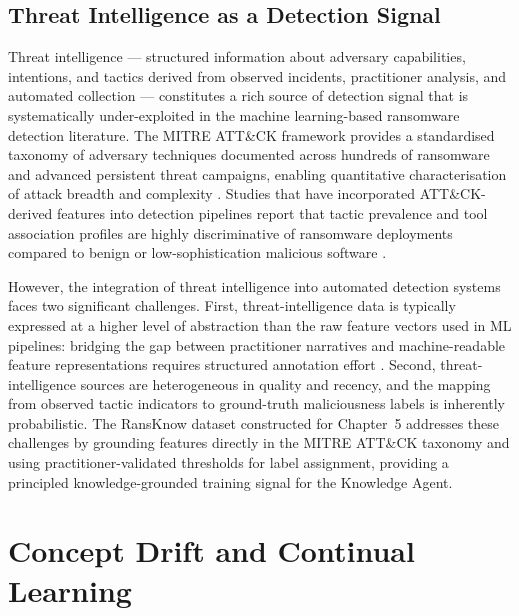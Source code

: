 \subsection{Threat Intelligence as a Detection Signal}
\label{sec:lit_ti}

Threat intelligence — structured information about adversary capabilities, intentions, and
tactics derived from observed incidents, practitioner analysis, and automated
collection — constitutes a rich source of detection signal that is systematically under-exploited
in the machine learning-based ransomware detection literature.
The MITRE ATT\&CK framework provides a standardised taxonomy of adversary techniques
documented across hundreds of ransomware and advanced persistent threat campaigns, enabling
quantitative characterisation of attack breadth and complexity \cite{razaulla2023age}.
Studies that have incorporated ATT\&CK-derived features into detection pipelines report that
tactic prevalence and tool association profiles are highly discriminative of ransomware
deployments compared to benign or low-sophistication malicious software \cite{Alraizza2025StorageAP}.

However, the integration of threat intelligence into automated detection systems faces two
significant challenges.
First, threat-intelligence data is typically expressed at a higher level of abstraction than
the raw feature vectors used in ML pipelines: bridging the gap between practitioner
narratives and machine-readable feature representations requires structured annotation
effort \cite{Ispahany2024Survey}.
Second, threat-intelligence sources are heterogeneous in quality and recency, and the mapping
from observed tactic indicators to ground-truth maliciousness labels is inherently
probabilistic.
The RansKnow dataset constructed for Chapter~5 addresses these challenges by grounding
features directly in the MITRE ATT\&CK taxonomy and using practitioner-validated thresholds
for label assignment, providing a principled knowledge-grounded training signal for the
Knowledge Agent.

\section{Concept Drift and Continual Learning}
\label{sec:lit_cd}

